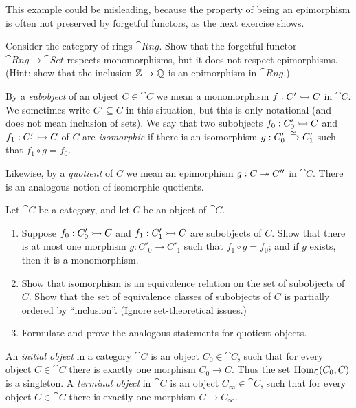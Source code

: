 This example could be misleading, because the property of being an epimorphism 
is often not preserved by forgetful functors, as the next exercise shows. 

\begin{exer} \label{exer:1310}
Consider the category of rings $\cat{Rng}$.
Show that the forgetful functor 
$\cat{Rng} \to \cat{Set}$ respects monomorphisms, but it does not respect
epimorphisms. 
(Hint: show that the inclusion $\mathbb{Z} \to \mathbb{Q}$ is an epimorphism in 
$\cat{Rng}$.)  
\end{exer}

By a {\em subobject} of an object $C \in \cat{C}$ we mean a monomorphism 
$f : C' \rightarrowtail C$ in $\cat{C}$. We sometimes write $C' \subseteq C$ in this 
situation, but this is only notational (and does not mean inclusion of sets). 
We say that two subobjects $f_0 : C'_0 \rightarrowtail C$ and $f_1 : C'_1 \rightarrowtail C$ of $C$
are {\em isomorphic} if  there is an isomorphism $g : C'_0 \xrightarrow{\simeq} C'_1$ such that 
$f_1 \circ g = f_0$.

Likewise, by a {\em quotient} of $C$ we mean an 
epimorphism $g : C \twoheadrightarrow C''$ in $\cat{C}$. There is an analogous notion of 
isomorphic quotients. 

\begin{exer} \label{exer:1676}
Let $\cat{C}$ be a category, and let $C$ be an object of $\cat{C}$. 
\begin{enumerate}
\item Suppose $f_0 : C'_0 \rightarrowtail C$ and $f_1 : C'_1 \rightarrowtail C$ are subobjects of
$C$. Show that there is at most one morphism $g : C'_0 \to C'_1$ such that 
$f_1 \circ g = f_0$; and if $g$ exists, then it is a monomorphism. 

\item Show that isomorphism is an equivalence relation on the set of subobjects 
of $C$. Show that the set of equivalence classes of subobjects of $C$ is 
partially ordered by ``inclusion''. (Ignore set-theoretical issues.) 

\item Formulate and prove the analogous statements for quotient objects. 
\end{enumerate}
\end{exer}

An {\em initial object} in a category $\cat{C}$ is an object 
$C_0 \in \cat{C}$,
such that for every object $C \in \cat{C}$ there is exactly one morphism 
$C_0 \to C$. Thus the set $\operatorname{Hom}_{\operatorname{\mathsf{C}}}(C_0, C)$ is a singleton.
A {\em terminal object} in $\cat{C}$ is an object $C_{\infty} \in \cat{C}$,
such that for every object $C \in \cat{C}$ there is exactly one morphism 
$C \to C_{\infty}$.

